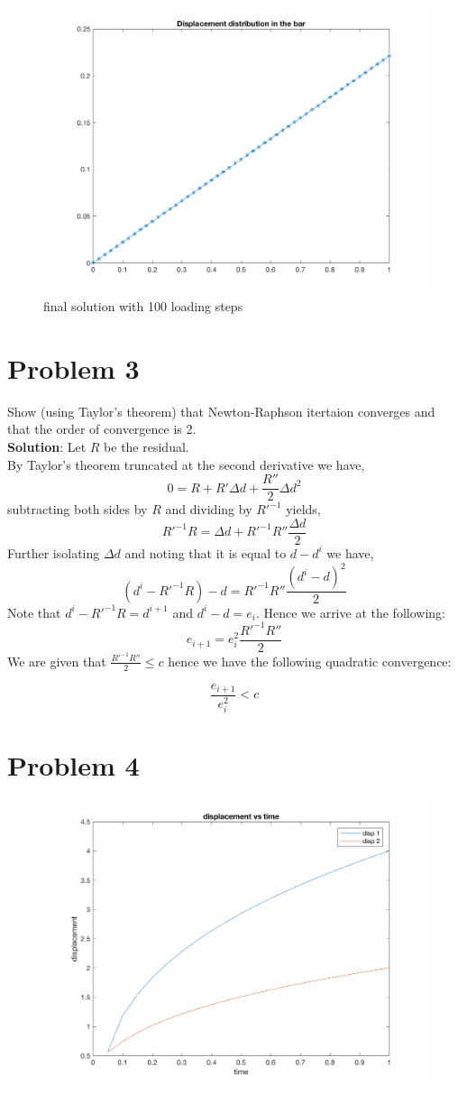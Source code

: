 \documentclass[12pt,a4paper]{article}
\begin{document}
\begin{figure}[h!]
	\centering
	\includegraphics[width=0.7\linewidth]{problem2}
	\caption{final solution with 100 loading steps}
	\label{fig:problem2}
\end{figure}
	
	\section{Problem 3}
	Show (using Taylor's theorem) that Newton-Raphson itertaion converges and that the order of convergence is 2.\\
	\textbf{Solution}:
	Let $R$ be the residual.\\
	By Taylor's theorem truncated at the second derivative we have,
	$$0=R+R'\Delta d + \frac{R''}{2} \Delta d^2 $$
	subtracting both sides by $R$ and dividing by $R'^{-1}$ yields,
	$$R'^{-1}R = \Delta d + R'^{-1}R''\frac{\Delta d}{2} $$
	Further isolating 	$\Delta d$ and noting that it is equal to $d-d^i$ we have,
	$$(d^i-R'^{-1}R)-d = R'^{-1}R''\frac{(d^i-d)^2}{2} $$
	Note that $d^i-R'^{-1}R = d^{i+1}$ and $d^i-d = e_i$. Hence we arrive at the following:
	$$e_{i+1} = e_{i}^2\frac{R'^{-1}R''}{2} $$
	We are given that $\frac{R'^{-1}R''}{2} \leq c$ hence we have the following quadratic convergence:
	
	$$\frac{e_{i+1}}{e_{i}^2} < c $$
	\newpage
	\section{Problem 4}
	
	
	
\begin{figure}[h!]
	\centering
	\includegraphics[width=0.7\linewidth]{problem4}

	\label{fig:problem4}
\end{figure}
	
	
\end{document}
